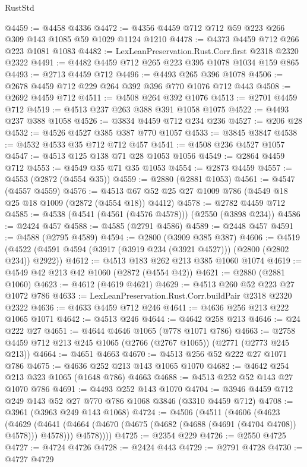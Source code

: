 \begin{lexlean}{RustStd}
\begin{coremodule}
@4459 := @4458 @4336
@4472 := @4356 @4459 @712 @712 @59 @223 @266 @309 @143 @1085 @59 @1029 @1124 @1210
@4478 := @4373 @4459 @712 @266 @223 @1081 @1083
@4482 := LexLeanPreservation.Rust.Corr.first @2318 @2320 @2322
@4491 := @4482 @4459 @712 @265 @223 @395 @1078 @1034 @159 @865
@4493 := @2713 @4459 @712
@4496 := @4493 @265 @396 @1078
@4506 := @2678 @4459 @712 @229 @264 @392 @396 @770 @1076 @712 @443
@4508 := @2692 @4459 @712
@4511 := @4508 @264 @392 @1076
@4513 := @2701 @4459 @712
@4519 := @4513 @237 @263 @388 @391 @1058 @1075
@4522 := @4493 @237 @388 @1058
@4526 := @3834 @4459 @712 @234 @236
@4527 := @206 @28
@4532 := @4526 @4527 @385 @387 @770 @1057
@4533 := @3845 @3847
@4538 := @4532 @4533 @35 @712 @712 @457
@4541 := @4508 @236 @4527 @1057
@4547 := @4513 @125 @138 @71 @28 @1053 @1056
@4549 := @2864 @4459 @712
@4553 := @4549 @35 @71 @35 @1053
@4554 := @2873 @4459
@4557 := @4553 (@2872 (@4554 @35))
@4559 := @2880 (@2881 @1053)
@4561 := @4547 (@4557 @4559)
@4576 := @4513 @67 @52 @25 @27 @1009 @786 (@4549 @18 @25 @18 @1009 (@2872 (@4554 @18)) @4412)
@4578 := @2782 @4459 @712
@4585 := @4538 (@4541 (@4561 (@4576 @4578))) (@2550 (@3898 @234))
@4586 := @2424 @457
@4588 := @4585 (@2791 @4586)
@4589 := @2448 @457
@4591 := @4588 (@2795 @4589)
@4594 := @2800 (@3909 @385 @387)
@4606 := @4519 (@4522 (@4591 @4594 (@3917 (@3919 @234 (@3921 @4527))) (@2800 (@2802 @234)) @2922))
@4612 := @4513 @183 @262 @213 @385 @1060 @1074
@4619 := @4549 @42 @213 @42 @1060 (@2872 (@4554 @42))
@4621 := @2880 (@2881 @1060)
@4623 := @4612 (@4619 @4621)
@4629 := @4513 @260 @52 @223 @27 @1072 @786
@4633 := LexLeanPreservation.Rust.Corr.buildPair @2318 @2320 @2322
@4636 := @4633 @4459 @712 @246
@4641 := @4636 @256 @213 @222 @1065 @1071
@4642 := @4513 @246
@4644 := @4642 @258 @213
@4646 := @24 @222 @27
@4651 := @4644 @4646 @1065 (@778 @1071 @786)
@4663 := @2758 @4459 @712 @213 @245 @1065 (@2766 (@2767 @1065)) (@2771 (@2773 @245 @213))
@4664 := @4651 @4663
@4670 := @4513 @256 @52 @222 @27 @1071 @786
@4675 := @4636 @252 @213 @143 @1065 @1070
@4682 := @4642 @254 @213 @323 @1065 (@1648 @786) @4663
@4688 := @4513 @252 @52 @143 @27 @1070 @786
@4691 := @4493 @252 @143 @1070
@4704 := @3946 @4459 @712 @249 @143 @52 @27 @770 @786 @1068 @3846 (@3310 @4459 @712)
@4708 := @3961 (@3963 @249 @143 @1068)
@4724 := @4506
    (@4511
      (@4606
        (@4623
          (@4629
            (@4641 (@4664 (@4670 (@4675 (@4682 (@4688 (@4691 (@4704 @4708)) @4578))) @4578)))
            @4578))))
@4725 := @2354 @229
@4726 := @2550 @4725
@4727 := @4724 @4726
@4728 := @2424 @443
@4729 := @2791 @4728
@4730 := @4727 @4729

\end{coremodule}
\end{lexlean}
